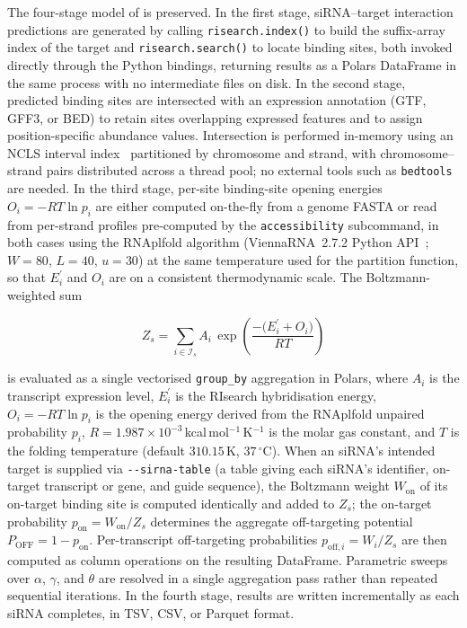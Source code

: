 \documentclass[11pt]{article}
\begin{document}
The four-stage model of \citet{alkan2017risearch2} is preserved.
In the first stage, siRNA--target interaction predictions are generated by calling \texttt{risearch.index()} to build the suffix-array index of the target and \texttt{risearch.search()} to locate binding sites, both invoked directly through the Python bindings, returning results as a Polars DataFrame in the same process with no intermediate files on disk.
In the second stage, predicted binding sites are intersected with an expression annotation (GTF, GFF3, or BED) to retain sites overlapping expressed features and to assign position-specific abundance values.
Intersection is performed in-memory using an NCLS interval index~\citep{ncls} partitioned by chromosome and strand, with chromosome--strand pairs distributed across a thread pool; no external tools such as \texttt{bedtools} are needed.
In the third stage, per-site binding-site opening energies $O_i = -RT\ln p_i$ are either computed on-the-fly from a genome FASTA or read from per-strand profiles pre-computed by the \texttt{accessibility} subcommand, in both cases using the RNAplfold algorithm (ViennaRNA~2.7.2 Python API~\citep{lorenz2011vienna}; $W{=}80$, $L{=}40$, $u{=}30$) at the same temperature used for the partition function, so that $E^\prime_i$ and $O_i$ are on a consistent thermodynamic scale.
The Boltzmann-weighted sum

\begin{equation}
  Z_s = \sum_{i \in \mathcal{I}_s}
        A_i \,
        \exp\!\left(\frac{-\bigl(E^\prime_i + O_i\bigr)}{RT}\right)
  \label{eq:partition}
\end{equation}

\noindent is evaluated as a single vectorised \texttt{group\_by} aggregation in Polars, where $A_i$ is the transcript expression level, $E^\prime_i$ is the RIsearch hybridisation energy, $O_i = -RT\ln p_i$ is the opening energy derived from the RNAplfold unpaired probability $p_i$, $R = 1.987\times10^{-3}$\,kcal\,mol$^{-1}$\,K$^{-1}$ is the molar gas constant, and $T$ is the folding temperature (default $310.15$\,K, $37\,^\circ$C).
When an siRNA's intended target is supplied via \texttt{-{}-sirna-table} (a table giving each siRNA's identifier, on-target transcript or gene, and guide sequence), the Boltzmann weight $W_{\mathrm{on}}$ of its on-target binding site is computed identically and added to $Z_s$; the on-target probability $p_{\mathrm{on}} = W_{\mathrm{on}} / Z_s$ determines the aggregate off-targeting potential $P_{\mathrm{OFF}} = 1 - p_{\mathrm{on}}$.
Per-transcript off-targeting probabilities $p_{\mathrm{off},i} = W_i / Z_s$ are then computed as column operations on the resulting DataFrame.
Parametric sweeps over $\alpha$, $\gamma$, and $\theta$ are resolved in a single aggregation pass rather than repeated sequential iterations.
In the fourth stage, results are written incrementally as each siRNA completes, in TSV, CSV, or Parquet format.
\end{document}
